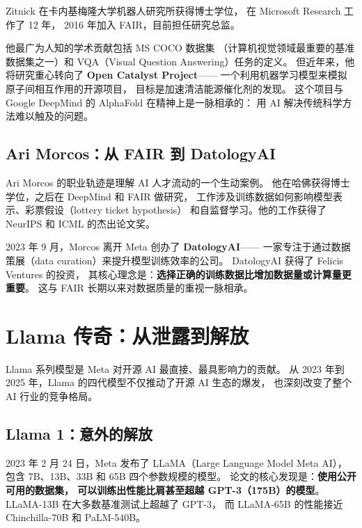 Zitnick 在卡内基梅隆大学机器人研究所获得博士学位，
在 Microsoft Research 工作了 12 年，
2016 年加入 FAIR，目前担任研究总监。

他最广为人知的学术贡献包括 MS COCO 数据集
（计算机视觉领域最重要的基准数据集之一）和
VQA（Visual Question Answering）任务的定义。
但近年来，他将研究重心转向了 \textbf{Open Catalyst Project}——
一个利用机器学习模型来模拟原子间相互作用的开源项目，
目标是加速清洁能源催化剂的发现。
这个项目与 Google DeepMind 的 AlphaFold 在精神上是一脉相承的：
用 AI 解决传统科学方法难以触及的问题。

\subsection{Ari Morcos：从 FAIR 到 DatologyAI}

Ari Morcos 的职业轨迹是理解 AI 人才流动的一个生动案例。
他在哈佛获得博士学位，之后在 DeepMind 和 FAIR 做研究，
工作涉及训练数据如何影响模型表示、彩票假设（lottery ticket hypothesis）
和自监督学习。他的工作获得了 NeurIPS 和 ICML 的杰出论文奖。

2023 年 9 月，Morcos 离开 Meta 创办了 \textbf{DatologyAI}——
一家专注于通过数据策展（data curation）来提升模型训练效率的公司。
DatologyAI 获得了 Felicis Ventures 的投资，
其核心理念是：\textbf{选择正确的训练数据比增加数据量或计算量更重要}。
这与 FAIR 长期以来对数据质量的重视一脉相承。


\section{Llama 传奇：从泄露到解放}
\label{sec:llama-saga}

Llama 系列模型是 Meta 对开源 AI 最直接、最具影响力的贡献。
从 2023 年到 2025 年，Llama 的四代模型不仅推动了开源 AI 生态的爆发，
也深刻改变了整个 AI 行业的竞争格局。

\subsection{Llama 1：意外的解放}

2023 年 2 月 24 日，Meta 发布了 LLaMA（Large Language Model Meta AI），
包含 7B、13B、33B 和 65B 四个参数规模的模型。
论文的核心发现是：\textbf{使用公开可用的数据集，
可以训练出性能比肩甚至超越 GPT-3（175B）的模型}。
LLaMA-13B 在大多数基准测试上超越了 GPT-3，
而 LLaMA-65B 的性能接近 Chinchilla-70B 和 PaLM-540B。

